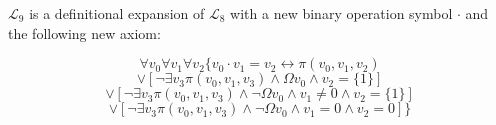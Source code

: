 $\mathcal{L}_9$ is a definitional expansion of $\mathcal{L}_8$ with a new binary operation symbol $\cdot$ and the following new axiom:

$$
\forall v_0 \forall v_1 \forall v_2 \bigl\{v_0 \cdot v_1 = v_2 \leftrightarrow \pi(v_0, v_1, v_2)
$$
$$
\vee [ \neg \exists v_3 \pi(v_0, v_1, v_3) \land \Omega v_0 \land v_2 = \{1\} ]
$$
$$
\vee [ \neg \exists v_3 \pi(v_0, v_1, v_3) \land \neg \Omega v_0 \land v_1 \neq 0 \land v_2 = \{1\} ]
$$
$$
\vee [ \neg \exists v_3 \pi(v_0, v_1, v_3) \land \neg \Omega v_0 \land v_1 = 0 \land v_2 = 0] \bigr\}
$$
